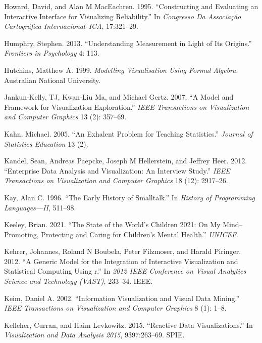 \documentclass[
  openany]{book}
\newlength{\cslhangindent}
\newenvironment{CSLReferences}[2] %
 {\begin{list}{}{%
  \setlength{\itemindent}{0pt}
  \setlength{\leftmargin}{0pt}
  \setlength{\parsep}{0pt}
  \ifodd #1
   \setlength{\leftmargin}{\cslhangindent}
   \setlength{\itemindent}{-1\cslhangindent}
  \fi
  \setlength{\itemsep}{#2\baselineskip}}}
 {\end{list}}
\theoremstyle{definition}
\theoremstyle{definition}
\theoremstyle{definition}
\theoremstyle{definition}
\theoremstyle{remark}
\begin{document}
\begin{CSLReferences}{1}{0}
Howard, David, and Alan M MacEachren. 1995. {``Constructing and Evaluating an Interactive Interface for Visualizing Reliability.''} In \emph{Congresso Da Associa{ç}{ã}o Cartogr{á}fica Internacional--ICA}, 17:321--29.

Humphry, Stephen. 2013. {``Understanding Measurement in Light of Its Origins.''} \emph{Frontiers in Psychology} 4: 113.

Hutchins, Matthew A. 1999. \emph{Modelling Visualisation Using Formal Algebra}. Australian National University.

Jankun-Kelly, TJ, Kwan-Liu Ma, and Michael Gertz. 2007. {``A Model and Framework for Visualization Exploration.''} \emph{IEEE Transactions on Visualization and Computer Graphics} 13 (2): 357--69.

Kahn, Michael. 2005. {``An Exhalent Problem for Teaching Statistics.''} \emph{Journal of Statistics Education} 13 (2).

Kandel, Sean, Andreas Paepcke, Joseph M Hellerstein, and Jeffrey Heer. 2012. {``Enterprise Data Analysis and Visualization: An Interview Study.''} \emph{IEEE Transactions on Visualization and Computer Graphics} 18 (12): 2917--26.

Kay, Alan C. 1996. {``The Early History of Smalltalk.''} In \emph{History of Programming Languages---II}, 511--98.

Keeley, Brian. 2021. {``The State of the World's Children 2021: On My Mind--Promoting, Protecting and Caring for Children's Mental Health.''} \emph{UNICEF}.

Kehrer, Johannes, Roland N Boubela, Peter Filzmoser, and Harald Piringer. 2012. {``A Generic Model for the Integration of Interactive Visualization and Statistical Computing Using r.''} In \emph{2012 IEEE Conference on Visual Analytics Science and Technology (VAST)}, 233--34. IEEE.

Keim, Daniel A. 2002. {``Information Visualization and Visual Data Mining.''} \emph{IEEE Transactions on Visualization and Computer Graphics} 8 (1): 1--8.

Kelleher, Curran, and Haim Levkowitz. 2015. {``Reactive Data Visualizations.''} In \emph{Visualization and Data Analysis 2015}, 9397:263--69. SPIE.


\end{CSLReferences}
\end{document}
